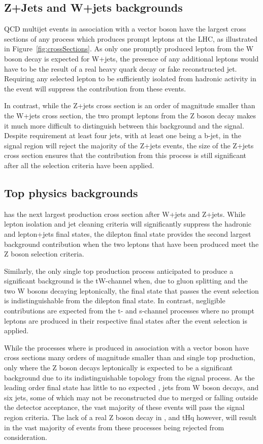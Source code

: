 \subsection{Z+Jets and W+jets backgrounds}
QCD multijet events in association with a vector boson have the largest cross sections of any process which produces prompt leptons at the LHC, as illustrated in Figure~\ref{fig:crossSections}.
As only one promptly produced lepton from the W boson decay is expected for W+jets, the presence of any additional leptons would have to be the result of a real heavy quark decay or fake reconstructed jet. 
Requiring any selected lepton to be sufficiently isolated from hadronic activity in the event will suppress the contribution from these events.

In contrast, while the Z+jets cross section is an order of magnitude smaller than the W+jets cross section, the two prompt leptons from the Z boson decay makes it much more difficult to distinguish between this background and the signal.
Despite requirement at least four jets, with at least one being a b-jet, in the signal region will reject the majority of the Z+jets events, the size of the Z+jets cross section ensures that the contribution from this process is still significant after all the selection criteria have been applied.

\subsection{Top physics backgrounds}
\ttbar has the next largest production cross section after W+jets and Z+jets.
While lepton isolation and jet cleaning criteria will significantly suppress the hadronic and lepton+jets final states, the dilepton final state provides the second largest background contribution when the two leptons that have been produced meet the Z boson selection criteria.

Similarly, the only single top production process anticipated to produce a significant background is the tW-channel when, due to gluon splitting and the two W bosons decaying leptonically, the final state that passes the event selection is indistinguishable from the \ttbar dilepton final state.
In contrast, negligible contributions are expected from the t- and s-channel processes
where no prompt leptons are produced in their respective final states after the event selection is applied.

While the processes where \ttbar is produced in association with a vector boson have cross sections many orders of magnitude smaller than \ttbar and single top production, only \ttbarZ where the Z boson decays leptonically is expected to be a significant background due to its indistinguishable topology from the signal process.
As the leading order final state has little to no expected \MET, jets from W boson decays, and six jets,
some of which may not be reconstructed due to merged or falling outside the detector acceptance, the vast majority of these events will pass the signal region criteria.
The lack of a real Z boson decay in \ttbarW, \ttbarH and tHq however, will result in the vast majority of events from these processes being rejected from consideration.

